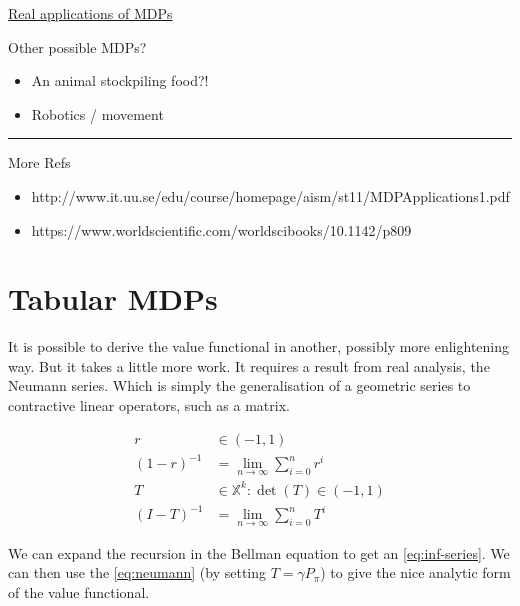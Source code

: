 \href{http://www.it.uu.se/edu/course/homepage/aism/st11/MDPApplications1.pdf}{Real
applications of MDPs}

Other possible MDPs?

\begin{itemize}
\tightlist
\item
  An animal stockpiling food?!
\item
  Robotics / movement
\end{itemize}

\begin{center}\rule{0.5\linewidth}{\linethickness}\end{center}

More Refs

\begin{itemize}
\tightlist
\item
  http://www.it.uu.se/edu/course/homepage/aism/st11/MDPApplications1.pdf
\item
  https://www.worldscientific.com/worldscibooks/10.1142/p809
\end{itemize}

\section{Tabular MDPs}\label{vf-neumann}

It is possible to derive the value functional in another, possibly more enlightening way. But it takes a little more work. It requires a result from real analysis, the Neumann series. Which is simply the generalisation of a geometric series to contractive linear operators, such as a matrix.

\begin{align*}
r &\in (-1, 1) \\
(1-r)^{-1} &= \lim_{n\to \infty} \sum_{i=0}^n r^i \tag{Geometric series}\\
T &\in \mathbb X^k: \det(T) \in (-1, 1) \\
(I-T)^{-1} &= \lim_{n\to \infty} \sum_{i=0}^n T^i \label{eq:neumann}\tag{Neumann series}
\end{align*}

We can expand the recursion in the Bellman equation to get an \eqref{eq:inf-series}. We can then use the \eqref{eq:neumann} (by setting $T=\gamma P_{\pi}$) to give the nice analytic form of the value functional.

